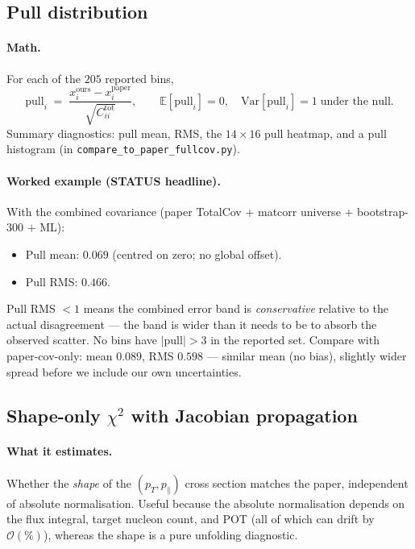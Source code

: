 \documentclass[12pt]{article}
\newcommand{\pT}{p_{T}}
\newcommand{\pPar}{p_{\parallel}}
\newcommand{\ours}{\text{ours}}
\newcommand{\paper}{\text{paper}}
\newcommand{\tot}{\text{tot}}
\begin{document}
\subsection{Pull distribution}
\label{sec:pull}

\paragraph{Math.}
For each of the $205$ reported bins,
\begin{equation}
\mathrm{pull}_{i}
\;=\;
\frac{x^{\ours}_{i} - x^{\paper}_{i}}{\sqrt{C^{\tot}_{ii}}},
\qquad
\mathbb{E}[\mathrm{pull}_{i}] = 0,\quad
\mathrm{Var}[\mathrm{pull}_{i}] = 1
\;\text{under the null}.
\end{equation}
Summary diagnostics: pull mean, RMS, the $14\times16$ pull heatmap,
and a pull histogram (in \texttt{compare\_to\_paper\_fullcov.py}).

\paragraph{Worked example (STATUS headline).}
With the combined covariance (paper TotalCov $+$ matcorr universe $+$
bootstrap-300 $+$ ML):
\begin{itemize}[nosep]
  \item Pull mean: $\boxed{0.069}$ (centred on zero; no global offset).
  \item Pull RMS: $\boxed{0.466}$.
\end{itemize}
Pull RMS $< 1$ means the combined error band is \emph{conservative}
relative to the actual disagreement --- the band is wider than it
needs to be to absorb the observed scatter. No bins have
$|\mathrm{pull}|>3$ in the reported set. Compare with paper-cov-only:
mean $0.089$, RMS $0.598$ --- similar mean (no bias), slightly wider
spread before we include our own uncertainties.

\subsection{Shape-only $\chi^{2}$ with Jacobian propagation}
\label{sec:shape}

\paragraph{What it estimates.}
Whether the \emph{shape} of the $(\pT,\pPar)$ cross section matches
the paper, independent of absolute normalisation. Useful because the
absolute normalisation depends on the flux integral, target nucleon
count, and POT (all of which can drift by $\mathcal{O}(\%)$), whereas
the shape is a pure unfolding diagnostic.
\end{document}
